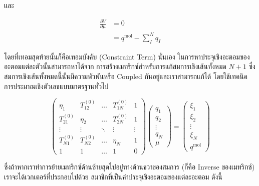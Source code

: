 \noindent และ

\begin{align}
  \frac{\partial V}{\partial \mu}
   & =
  0    \\
   & =
  q^{\mathrm{mol}}-\sum_I^N q_I
\end{align}

\noindent โดยที่เทอมสุดท้ายนั้นก็คือเทอมบังคับ (Constraint Term) นั่นเอง ในการหาประจุเชิงอะตอมของอะตอมแต่ละตัวนั้นสามารถหาได้จาก%
การสร้างเมทริกซ์สำหรับการแก้สมการเชิงเส้นทั้งหมด $N+1$ ซึ่งสมการเชิงเส้นทั้งหมดนี้นั้นมีความพัวพันหรือ Coupled กันอยู่และเราสามารถแก้ได้%
โดยใช้เทคนิคการประมาณเชิงตัวเลขแบบมาตรฐานทั่วไป

\begin{equation}
  \left(\begin{array}{ccccc}
    \eta_1        & T_{12}^{(0)}  & \ldots & T_{1 N}^{(0)} & 1      \\
    T_{21}^{(0)}  & \eta_2        & \ldots & T_{2 N}^{(0)} & 1      \\
    \vdots        & \vdots        & \ddots & \vdots        & \vdots \\
    T_{N 1}^{(0)} & T_{N 2}^{(0)} & \ldots & \eta_N        & 1      \\
    1             & 1             & \ldots & 1             & 0
  \end{array}\right)\left(\begin{array}{c}
    q_1    \\
    q_2    \\
    \vdots \\
    q_N    \\
    \mu
  \end{array}\right)
  =
  \left(\begin{array}{c}
    \xi_1  \\
    \xi_2  \\
    \vdots \\
    \xi_N  \\
    q^{\mathrm{mol}}
  \end{array}\right)
\end{equation}

\noindent ซึ่งถ้าหากเราทำการย้ายเมทริกซ์ด้านซ้ายสุดไปอยู่ทางด้านขวาของสมการ (ก็คือ Inverse ของเมทริกซ์) เราจะได้เวกเตอร์ที่ประกอบไปด้วย%
สมาชิกที่เป็นค่าประจุเชิงอะตอมของแต่ละอะตอม ดังนี้

